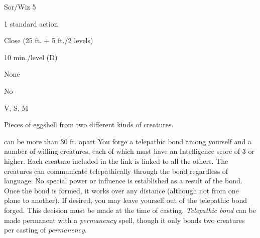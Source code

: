 
\begin{description*}
\item[Level:] Sor/Wiz 5
\item[Casting Time:] 1 standard action
\item[Range:] Close (25 ft. + 5 ft./2 levels)
\item[Duration:] 10 min./level (D)
\item[Saving Throw:] None
\item[Spell Resistance:] No
\item[Components:] V, S, M
\item[Arcane Material Component:] Pieces of eggshell from two different kinds of creatures.
\end{description*}

can be more than 30 ft. apart
You forge a telepathic bond among yourself and a number of willing creatures, each
of which must have an Intelligence score of 3 or higher. Each creature included
in the link is linked to all the others. The creatures can communicate telepathically
through the bond regardless of language. No special power or influence is established
as a result of the bond. Once the bond is formed, it works over any distance (although
not from one plane to another).
If desired, you may leave yourself out of the telepathic bond forged. This decision
must be made at the time of casting.
\textit{Telepathic bond} can be made permanent with a \textit{permanency} spell,
though it only bonds two creatures per casting of \textit{permanency}.